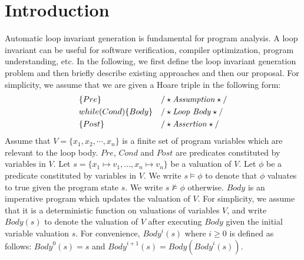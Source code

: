 
\section{Introduction} %
\label{sec:introduction}
Automatic loop invariant generation is fundamental for program analysis. A loop invariant can be useful for software verification, compiler optimization, program understanding, etc. In the following, we first define the loop invariant generation problem and then briefly describe existing approaches and then our proposal. For simplicity, we assume that we are given a Hoare triple in the following form:
\begin{align*}
&\{Pre\} & & /\star\text{\emph{Assumption}}\star/ \\
&while (Cond) \{ Body \} && /\star\text{\emph{Loop Body}}\star/\\
&\{Post\} & & /\star\text{\emph{Assertion}}\star/
\end{align*}
Assume that $V = \{x_1{,} x_2{,} \cdots{,} x_n\}$ is a finite set of program variables which are relevant to the loop body. $Pre$, $Cond$ and $Post$ are predicates constituted by variables in $V$.
Let $s = \{ x_1 \mapsto v_1, \ldots, x_n \mapsto v_n \}$ be a valuation of $V$. Let $\phi$ be a predicate constituted by variables in $V$. We write $s \models \phi$ to denote that $\phi$ valuates to true given the program state $s$. We write $s \not \models \phi$ otherwise.
$\mathit{Body}$ is an imperative program which updates the valuation of $V$. For simplicity, we assume that it is a deterministic function on valuations of variables $V$, and write $\mathit{Body}(s)$ to denote the valuation of $V$ after executing $\mathit{Body}$ given the initial variable valuation $s$. For convenience, $\mathit{Body}^i(s)$ where $i \geq 0$ is defined as follows: $\mathit{Body}^0(s) = s$ and $\mathit{Body}^{i+1}(s) = \mathit{Body}(\mathit{Body}^i(s))$.

